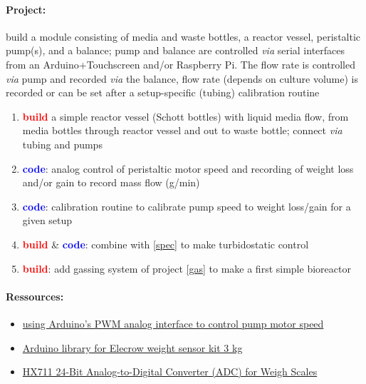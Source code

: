 \documentclass[12pt,a4paper]{scrartcl}
\newcommand{\build}[0]{\textcolor{red}{\textbf{build}}}
\newcommand{\code}[0]{\textcolor{blue}{\textbf{code}}}
\begin{document}
\paragraph{Project:} build a module consisting of media and waste bottles, a reactor vessel, peristaltic pump(s), and a balance; pump and balance are controlled  \textit{via} serial interfaces from  an Arduino+Touchscreen and/or
Raspberry Pi. The flow rate is controlled \textit{via} pump and
recorded \textit{via} the balance, flow rate (depends on culture
volume) is recorded or can be set after a setup-specific (tubing)
calibration routine



\begin{enumerate}
\item \build{} a simple reactor vessel (Schott bottles) with liquid
  media flow, from media bottles through reactor vessel and out to
  waste bottle; connect \textit{via} tubing and pumps
\item \code{}: analog control of peristaltic motor speed and recording of
  weight loss and/or gain to record mass flow (g/min)
\item \code{}: calibration routine to calibrate pump speed to weight loss/gain
  for a given setup
\item \build{} \& \code{}: combine with \ref{spec} to make
  turbidostatic control
\item \build{}: add gassing system of project \ref{gas} to make a first
  simple bioreactor
\end{enumerate}

\paragraph{Ressources:}
\begin{itemize}
\item
  \href{http://www.instructables.com/id/Control-peristaltic-pump-with-TA7291P-and-an-Ardui/}{using
    Arduino's PWM analog interface to control pump motor speed}
\item \href{http://www.elecrow.com/wiki/index.php?title=Weight_Sensor_Scales_Kit-_20KG}{Arduino library for Elecrow weight sensor kit 3 kg}
\item \href{https://cdn.sparkfun.com/datasheets/Sensors/ForceFlex/hx711_english.pdf}{HX711 24-Bit Analog-to-Digital Converter (ADC) for Weigh Scales}
\end{itemize}
\end{document}

